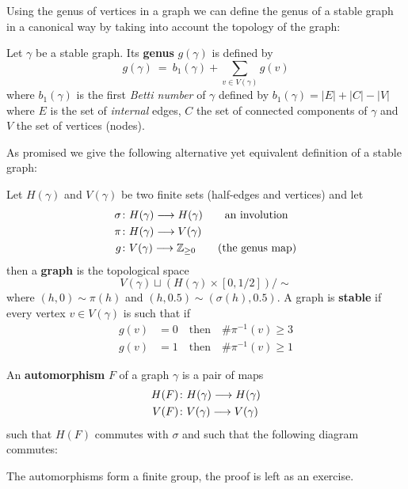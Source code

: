 Using the genus of vertices in a graph we can define the genus of a stable graph in a canonical way by taking into account the topology of the graph:

\begin{definition}
  Let $\gamma$ be a stable graph. Its \textbf{genus} $g(\gamma)$ is defined by
  \begin{equation}g(\gamma) \ = \ b_1(\gamma) + \sum_{v\in V(\gamma)} g(v)\end{equation}
  where $b_1(\gamma)$ is the first \emph{Betti number} of $\gamma$ defined by $b_1(\gamma) = |E| + |C| - |V|$ where $E$ is the set of \emph{internal} edges, $C$ the set of connected components of $\gamma$ and $V$ the set of vertices (nodes).
\end{definition}

As promised we give the following alternative yet equivalent definition of a stable graph:

\begin{definition}
  Let $H(\gamma)$ and $V(\gamma)$ be two finite sets (half-edges and vertices) and let
  \begin{align}
    \sigma &\colon H(\gamma) \longrightarrow H(\gamma) \quad \quad \text{an involution}\\
    \pi &\colon H(\gamma) \longrightarrow V(\gamma)\\
    g &\colon V(\gamma) \longrightarrow \mathbb{Z}_{\geq 0} \quad \quad \text{(the genus map)}
  \end{align}
  then a \textbf{graph} is the topological space
  \begin{equation}V(\gamma) \sqcup (H(\gamma) \times [0, 1/2]) / \sim\end{equation}
  where $(h,0) \sim \pi(h)$ and $(h,0.5) \sim (\sigma(h), 0.5)$. A graph is \textbf{stable} if every vertex $v \in V(\gamma)$ is such that if
  \begin{align}
    g(v) &= 0 \quad \text{then} \quad \# \pi^{-1}(v) \geq 3\\
    g(v) &= 1 \quad \text{then} \quad \# \pi^{-1}(v) \geq 1
  \end{align}
\end{definition}

\begin{definition}
  An \textbf{automorphism} $F$ of a graph $\gamma$ is a pair of maps
  \begin{align}
    H(F) &\colon H(\gamma) \longrightarrow H(\gamma)\\
    V(F) &\colon V(\gamma) \longrightarrow V(\gamma)
  \end{align}
  such that $H(F)$ commutes with $\sigma$ and such that the following diagram commutes:
  \begin{center}
  \end{center}
  The automorphisms form a finite group, the proof is left as an exercise.
\end{definition}

